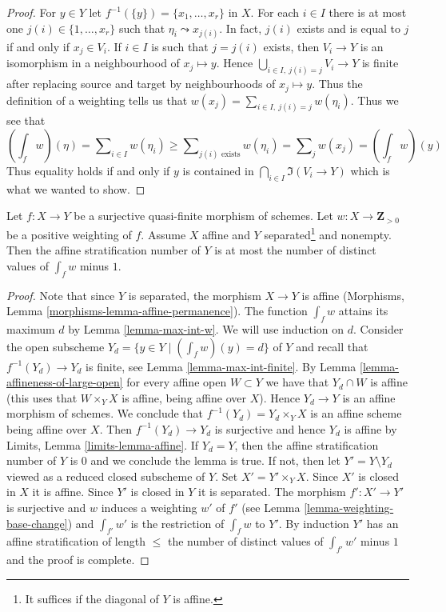 \begin{proof}
\medskip\noindent
For $y \in Y$ let $f^{-1}(\{y\}) = \{x_1, \ldots, x_r\}$ in $X$.
For each $i \in I$ there is at most one $j(i) \in \{1, \ldots, x_r\}$
such that $\eta_i \leadsto x_{j(i)}$. In fact, $j(i)$ exists and is
equal to $j$ if and only if $x_j \in V_i$. If $i \in I$ is such that
$j = j(i)$ exists, then $V_i \to Y$ is an isomorphism in a neighbourhood
of $x_j \mapsto y$. Hence $\bigcup_{i \in I,\ j(i) = j} V_i \to Y$
is finite after replacing source and target by neighbourhoods of
$x_j \mapsto y$. Thus the definition of a weighting tells us that
$w(x_j) = \sum_{i \in I,\ j(i) = j} w(\eta_i)$.
Thus we see that
$$
(\textstyle{\int}_f w)(\eta) =
\sum\nolimits_{i \in I} w(\eta_i) \geq
\sum\nolimits_{j(i)\text{ exists}} w(\eta_i) =
\sum\nolimits_j w(x_j) = (\textstyle{\int}_f w)(y)
$$
Thus equality holds if and only if $y$ is contained in
$\bigcap_{i \in I} \Im(V_i \to Y)$ which is what we wanted to show.
\end{proof}

\begin{proposition}
\label{proposition-asn-weighting}
Let $f : X \to Y$ be a surjective quasi-finite morphism of schemes.
Let $w : X \to \mathbf{Z}_{> 0}$ be a positive weighting of $f$.
Assume $X$ affine and $Y$ separated\footnote{It suffices if the
diagonal of $Y$ is affine.} and nonempty. Then the affine stratification
number of $Y$ is at most the number of distinct values of $\int_f w$
minus $1$.
\end{proposition}

\begin{proof}
Note that since $Y$ is separated, the morphism $X \to Y$ is affine
(Morphisms, Lemma \ref{morphisms-lemma-affine-permanence}).
The function $\int_f w$ attains its maximum $d$ by
Lemma \ref{lemma-max-int-w}. We will use induction on $d$.
Consider the open subscheme $Y_d = \{y \in Y \mid (\int_f w)(y) = d\}$
of $Y$ and recall that $f^{-1}(Y_d) \to Y_d$ is finite, see
Lemma \ref{lemma-max-int-finite}.
By Lemma \ref{lemma-affineness-of-large-open}
for every affine open $W \subset Y$ we have that $Y_d \cap W$ is affine
(this uses that $W \times_Y X$ is affine, being affine over $X$).
Hence $Y_d \to Y$ is an affine morphism of schemes. We
conclude that $f^{-1}(Y_d) = Y_d \times_Y X$ is
an affine scheme being affine over $X$.
Then $f^{-1}(Y_d) \to Y_d$ is surjective and
hence $Y_d$ is affine by Limits, Lemma \ref{limits-lemma-affine}.
If $Y_d = Y$, then the affine stratification number of $Y$ is $0$
and we conclude the lemma is true. If not, then let
$Y' = Y \setminus Y_d$ viewed as a reduced closed subscheme of $Y$.
Set $X' = Y' \times_Y X$.
Since $X'$ is closed in $X$ it is affine. Since
$Y'$ is closed in $Y$ it is separated.
The morphism $f' : X' \to Y'$ is surjective and
$w$ induces a weighting $w'$ of $f'$ (see
Lemma \ref{lemma-weighting-base-change}) and
$\int_{f'} w'$ is the restriction of $\int_f w$ to $Y'$.
By induction $Y'$ has an affine stratification of
length $\leq$ the number of distinct values of
$\int_{f'} w'$ minus $1$ and the proof is complete.
\end{proof}









